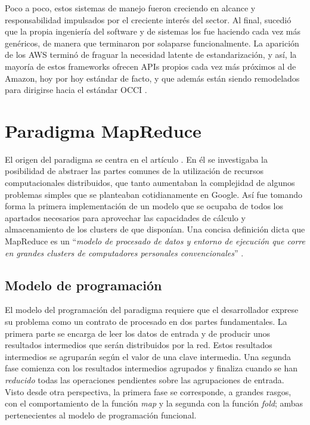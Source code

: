Poco a poco, estos sistemas de manejo fueron creciendo en alcance y res\-pon\-sa\-bi\-li\-dad impulsados por el creciente inter\'es del sector. Al final, sucedi\'o que la propia ingenier\'ia del software y de sistemas los fue haciendo cada vez m\'as gen\'ericos, de manera que terminaron por solaparse funcionalmente. La aparici\'on de los AWS termin\'o de fraguar la necesidad latente de estandarizaci\'on, y as\'i, la mayor\'ia de estos frameworks ofrecen APIs propios cada vez m\'as pr\'oximos al de Amazon, hoy por hoy est\'andar de facto, y que adem\'as est\'an siendo remodelados para dirigirse hacia el est\'andar OCCI \cite{occisdraft}.


\section{Paradigma MapReduce}\label{sec:mapred}
\noindent El origen del paradigma se centra en el art\'iculo \cite{googlemapreduce}. En \'el se investigaba la posibilidad de abstraer las partes comunes de la utilizaci\'on de recursos computacionales distribuidos, que tanto aumentaban la complejidad de algunos problemas simples que se planteaban cotidianamente en Google. As\'i fue tomando forma la primera implementaci\'on de un modelo que se ocupaba de todos los apartados necesarios para aprovechar las capacidades de c\'alculo y almacenamiento de los clusters de que dispon\'ian. Una concisa definici\'on dicta que MapReduce es un ``\textit{modelo de procesado de datos y entorno de ejecuci\'on que corre en grandes clusters de computadores personales convencionales}'' \cite{hadoopdefguide}.


\subsection{Modelo de programaci\'on}\label{subsec:programacionmapred}
\noindent El modelo del programaci\'on del paradigma requiere que el desarrollador ex\-pre\-se su problema como un contrato de procesado en dos partes fundamentales. La primera parte se encarga de leer los datos de entrada y de producir unos resultados intermedios que ser\'an distribuidos por la red. Estos resultados intermedios se agrupar\'an seg\'un el valor de una clave intermedia. Una segunda fase comienza con los resultados intermedios agrupados y finaliza cuando se han \emph{reducido} todas las operaciones pendientes sobre las agrupaciones de entrada. Visto desde otra perspectiva, la primera fase se co\-rres\-pon\-de, a grandes rasgos, con el comportamiento de la funci\'on \emph{map} y la segunda con la funci\'on \emph{fold}; ambas pertenecientes al modelo de programaci\'on funcional. \newline

